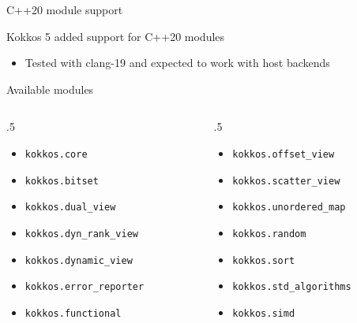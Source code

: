 \begin{frame}[fragile]{C++20 module support}

Kokkos 5 added support for C++20 modules
\begin{itemize}
\item Tested with clang-19 and expected to work with host backends
\end{itemize}
Available modules
\begin{columns}
\begin{column}{.5\linewidth}
\begin{itemize}
\item \texttt{kokkos.core}
\item \texttt{kokkos.bitset}
\item \texttt{kokkos.dual\_view}
\item \texttt{kokkos.dyn\_rank\_view}
\item \texttt{kokkos.dynamic\_view}
\item \texttt{kokkos.error\_reporter}
\item \texttt{kokkos.functional}
\end{itemize}
\end{column}
\begin{column}{.5\linewidth}
\begin{itemize}
\item \texttt{kokkos.offset\_view}
\item \texttt{kokkos.scatter\_view}
\item \texttt{kokkos.unordered\_map}
\item \texttt{kokkos.random}
\item \texttt{kokkos.sort}
\item \texttt{kokkos.std\_algorithms}
\item \texttt{kokkos.simd}
\end{itemize}
\end{column}
\end{columns}
\end{frame}

